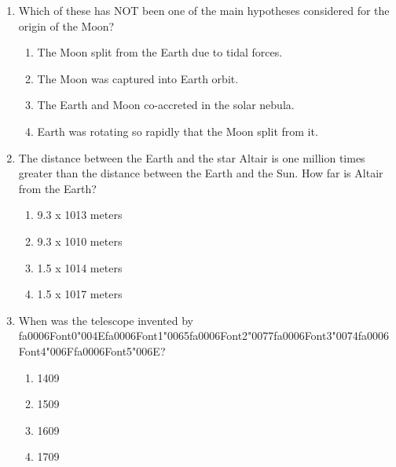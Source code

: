 \documentclass[12pt]{article}
\begin{document}
\begin{enumerate}[label=\arabic*.]
\begin{enumerate}[label=(\alph*)]
    \item Radar from the earth can only see Mercury's poles.
    \item These craters contain the only permanently shadowed regions on Mercury
\end{enumerate}
\item Which of these has NOT been one of the main hypotheses considered for the origin of the
Moon?
\begin{enumerate}[label=(\alph*)]
    \item The Moon split from the Earth due to tidal forces.
    \item The Moon was captured into Earth orbit.
    \item The Earth and Moon co-accreted in the solar nebula.
    \item Earth was rotating so rapidly that the Moon split from it.
\end{enumerate}
\item The distance between the Earth and the star Altair is one million times greater than the
distance between the Earth and the Sun. How far is Altair from the Earth?
\begin{enumerate}[label=(\alph*)]
    \item 9.3 x 1013 meters
    \item 9.3 x 1010 meters
    \item 1.5 x 1014 meters
    \item 1.5 x 1017 meters
\end{enumerate}
\item When was the telescope invented by {\csname fa0006Font0\endcsname\char"004E}{\csname fa0006Font1\endcsname\char"0065}{\csname fa0006Font2\endcsname\char"0077}{\csname fa0006Font3\endcsname\char"0074}{\csname fa0006Font4\endcsname\char"006F}{\csname fa0006Font5\endcsname\char"006E}?
\begin{enumerate}[label=(\alph*)]
    \item 1409
    \item 1509
    \item 1609
    \item 1709
\end{enumerate}
\end{enumerate}
\end{document}
